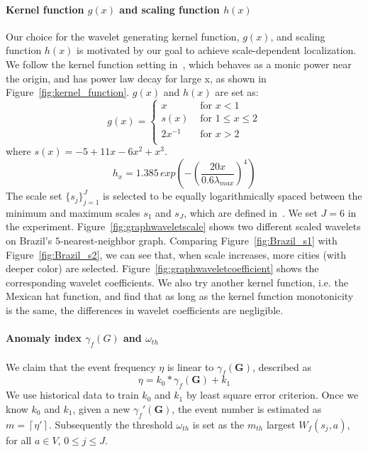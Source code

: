 \paragraph{Kernel function $g(x)$ and scaling function $h(x)$}
Our choice for the wavelet generating kernel function, $g(x)$, and scaling function $h(x)$ is motivated by our goal to achieve scale-dependent localization. We follow the kernel function setting in~\cite{hammond2011wavelets}, which behaves as a monic power near the origin, and has power law decay for large x, as shown in Figure~\ref{fig:kernel_function}. $g(x)$ and $h(x)$ are set as:
\begin{equation}
g(x) = \left\{ \begin{array}{rl}
 x &\mbox{ for $x<1$} \\
s(x) &\mbox{ for $1\leq x \leq 2$} \\
 2x^{-1} &\mbox{ for $x>2$} \\
       \end{array} \right.
\end{equation} where $s(x)=-5+11x-6x^2+x^3$.
\begin{equation}
h_{x}= 1.385\, exp(-(\frac{20x}{0.6\lambda_{max}})^4)
\end{equation}
The scale set $\{s_j\}_{j=1}^J$ is selected to be equally logarithmically spaced between the minimum and maximum scales $s_1$ and $s_J$, which are defined in~\cite{hammond2011wavelets}. We set $J=6$ in the experiment. Figure~\ref{fig:graphwaveletscale} shows two different scaled wavelets on Brazil's $5$-nearest-neighbor graph. Comparing Figure~\ref{fig:Brazil_s1} with Figure~\ref{fig:Brazil_s2}, we can see that, when scale increases, more cities (with deeper color) are selected. 
Figure~\ref{fig:graphwaveletcoefficient} shows the corresponding wavelet coefficients.
We also try another kernel function, i.e. the Mexican hat function, and find that as long as the kernel function monotonicity is the same,
the differences in wavelet coefficients are negligible.



\paragraph{Anomaly index $\gamma_f(G)$ and $\omega_{th}$}
We claim that the event frequency $\eta$ is linear to $\gamma_f(\mathbf{G})$, described as
\begin{equation}
\label{eq:linear_equation}
\eta = k_0*\gamma_f(\mathbf{G}) + k_1
\end{equation}We use historical data to train $k_0$ and $k_1$ by least square error criterion. Once we know
$k_0$ and $k_1$, given a new $\gamma_f'(\mathbf{G})$, the event number is estimated as $m=\left \lceil \eta' \right \rceil$. Subsequently the
threshold $\omega_{th}$ is set as the $m_{th}$ largest $W_f(s_j,a)$, for all $a\in V$, $0\le j \le J$.


